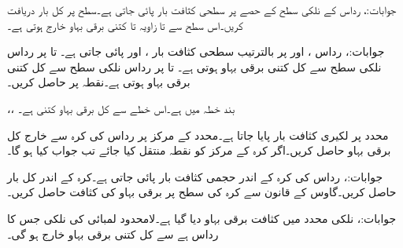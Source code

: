 جوابات:، 
رداس  کے نلکی سطح کے  حصے  پر سطحی کثافت بار  پائی جاتی ہے۔سطح پر کل بار دریافت کریں۔اس سطح سے  تا  زاویہ  تا  کتنی برقی بہاو خارج ہوتی ہے۔

جوابات:، 
رداس ،  اور  پر بالترتیب سطحی کثافت بار ،  اور  پائی جاتی ہے۔  تا   پر رداس  نلکی سطح سے کل کتنی برقی بہاو ہوتی ہے۔ تا   پر رداس  نلکی سطح سے کل کتنی برقی بہاو ہوتی ہے۔نقطہ  پر  حاصل کریں۔

،،
بند خطہ  میں  ہے۔اس خطے سے کل برقی بہاو کتنی ہے۔

محدد  پر لکیری کثافت بار  پایا جاتا ہے۔محدد کے مرکز پر رداس  کی کرہ سے خارج کل برقی بہاو حاصل کریں۔اگر کرہ کے مرکز کو نقطہ  منتقل کیا جائے تب جواب کیا ہو گا۔

جوابات:، 
رداس  کی کرہ کے اندر حجمی کثافت بار  پائی جاتی ہے۔کرہ کے اندر کل بار حاصل کریں۔گاوس کے قانون سے کرہ کی سطح پر برقی بہاو کی کثافت حاصل کریں۔

جوابات:، 
نلکی محدد میں کثافت برقی بہاو  دیا گیا ہے۔لامحدود لمبائی کی نلکی جس کا رداس  ہے سے کل کتنی برقی بہاو خارج ہو گی۔

